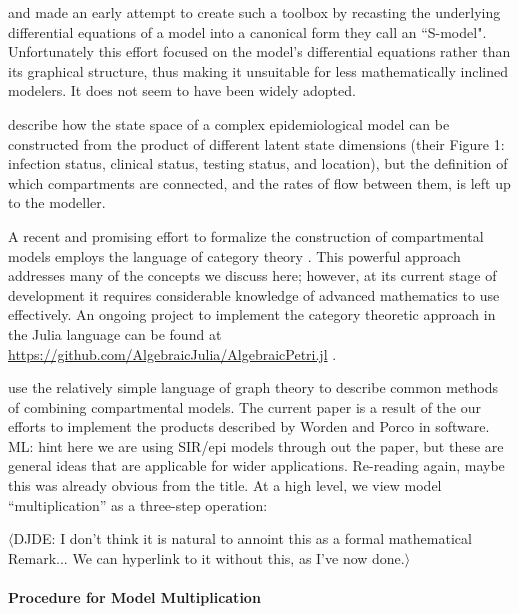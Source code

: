 \documentclass[pdflatex,sn-basic]{sn-jnl}%
\theoremstyle{definition}
\newcommand{\mli}[1]{{\color{purple} ML: #1}}
\newcommand{\david}[1]{{\color{cyan} $\langle$DJDE: #1$\rangle$}}
\begin{document}
\cite{savageau1988introduction} and \cite{voit1988recasting, voit1990s} made an early attempt to create such a toolbox by recasting the underlying differential equations of a model into a canonical form they call an ``S-model". Unfortunately this effort focused on the model's differential equations rather than its graphical structure, thus making it unsuitable for less mathematically inclined modelers. It does not seem to have been widely adopted.

\cite{friston2020dynamic} describe how the state space of a complex epidemiological model can be constructed from the product of different latent state dimensions (their Figure 1: infection status, clinical status, testing status, and location), but the definition of which compartments are connected, and the rates of flow between them, is left up to the modeller.

A recent and promising effort to formalize the construction of compartmental models employs the language of category theory \citep{fong2018seven, Libkind2022an, libkind2021operadic, baez2022compositional, baez2017compositional}. This powerful approach addresses many of the concepts we discuss here; however, at its current stage of development it requires considerable knowledge of advanced mathematics to use effectively.  An ongoing project to implement the category theoretic approach in the Julia language can be found at \url{https://github.com/AlgebraicJulia/AlgebraicPetri.jl} \citep{algebraicjulia}. 

\cite{worden2017products} use the relatively simple language of graph theory to describe common methods of combining compartmental models. The current paper is a result of the our efforts to implement the products described by Worden and Porco in software. \mli{hint here we are using SIR/epi models through out the paper, but these are general ideas that are applicable for wider applications. Re-reading again, maybe this was already obvious from the title.} At a high level, we view model ``multiplication'' as a three-step operation:

\david{I don't think it is natural to annoint this as a formal mathematical Remark... We can hyperlink to it without this, as I've now done.}

\paragraph{Procedure for Model Multiplication}\label{genproc}
\end{document}

